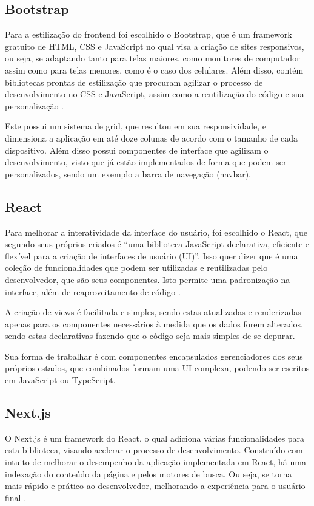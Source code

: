 \subsection{Bootstrap}
Para a estilização do frontend foi escolhido o Bootstrap, que é um framework gratuito de HTML, CSS e JavaScript no qual visa a criação de sites responsivos, ou seja, se adaptando tanto para telas maiores, como monitores de computador assim como para telas menores, como é o caso dos celulares. Além disso, contém bibliotecas prontas de estilização que procuram agilizar o processo de desenvolvimento no CSS e JavaScript, assim como a reutilização do código e sua personalização \cite{SPURLOCK}.

Este possui um sistema de grid, que resultou em sua responsividade, e dimensiona a aplicação em até doze colunas de acordo com o tamanho de cada dispositivo. Além disso possui componentes de interface que agilizam o desenvolvimento, visto que já estão implementados de forma que podem ser personalizados, sendo um exemplo a barra de navegação (navbar).

\subsection{React}
Para melhorar a interatividade da interface do usuário, foi escolhido o React, que segundo seus próprios criados é “uma biblioteca JavaScript declarativa, eficiente e flexível para a criação de interfaces de usuário (UI)”. Isso quer dizer que é uma coleção de funcionalidades que podem ser utilizadas e reutilizadas pelo desenvolvedor, que são seus componentes. Isto permite uma padronização na interface, além de reaproveitamento de código \cite{ZAMMETTI}.

A criação de views é facilitada e simples, sendo estas atualizadas e renderizadas apenas para os componentes necessários à medida que os dados forem alterados, sendo estas declarativas fazendo que o código seja mais simples de se depurar.

Sua forma de trabalhar é com componentes encapsulados gerenciadores dos seus próprios estados, que combinados formam uma UI complexa, podendo ser escritos em JavaScript ou TypeScript.

\subsection{Next.js}
O Next.js é um framework do React, o qual adiciona várias funcionalidades para esta biblioteca, visando acelerar o processo de desenvolvimento. Construído com intuito de melhorar o desempenho da aplicação implementada em React, há uma indexação do conteúdo da página e pelos motores de busca. Ou seja, se torna mais rápido e prático ao desenvolvedor, melhorando a experiência para o usuário final \cite{KONSHIN}.

